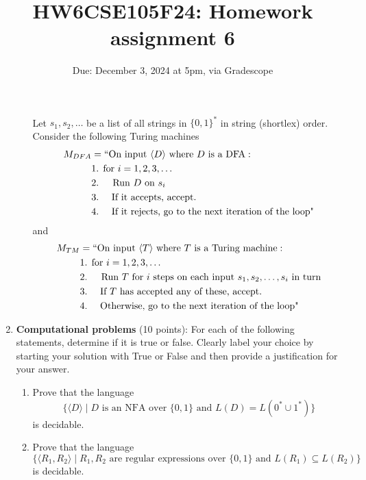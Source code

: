 \begin{enumerate}[wide, labelwidth=!, labelindent=0pt]
\begin{enumerate}
    Let $s_1, s_2, \ldots$ be a list of all strings in 
    $\{0,1\}^*$ in string (shortlex) order. Consider the following Turing machines
    \begin{align*}
        M_{DFA} &= ``\text{On input $\langle D \rangle$ where $D$ is a DFA}:\\
         &\text{1. for $i=1, 2, 3, \ldots$} \\
         &\text{2.~~~ Run $D$ on $s_i$} \\
         &\text{3.~~~~If it accepts, accept.}\\
         &\text{4.~~~~If it rejects, go to the next iteration of the loop"}\\
     \end{align*}
     and
     \begin{align*}
        M_{TM} &= ``\text{On input $\langle T \rangle$ where $T$ is a Turing machine}:\\
         &\text{1. for $i=1, 2, 3, \ldots$} \\
         &\text{2.~~~ Run $T$ for $i$ steps on each input $s_1, s_2, \ldots, s_i$ in turn} \\
         &\text{3.~~~~If $T$ has accepted any of these, accept.}\\
         &\text{4.~~~~Otherwise, go to the next iteration of the loop"}\\
     \end{align*}
\end{enumerate}


\item\textbf{Computational problems} (10 points):
For each of the following statements, determine if it is true or false. 
Clearly label your choice by starting your solution with True or False and then provide a 
 justification for your answer.

\begin{enumerate}
    \item\gradeCorrect Prove that the language $$\{\langle D \rangle \mid D \text{ is an NFA over $\{0,1\}$ and } L(D) = L(0^*\cup 1^*) \}$$
    is decidable.
    \item\gradeCorrect Prove that the language $$\{\langle R_1, R_2 \rangle \mid R_1, R_2 \text{ are regular expressions over $\{0,1\}$ and } L(R_1) \subseteq L(R_2) \}$$ is decidable.
\end{enumerate}

\end{enumerate}
\newpage

\title{HW6CSE105F24: Homework assignment 6}
\date{Due: December 3, 2024 at 5pm, via Gradescope}



